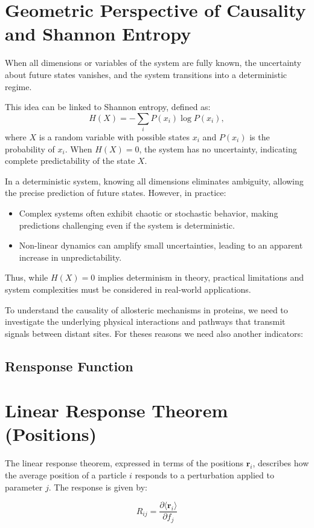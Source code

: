 \documentclass[English, Lau, oneside]{sapthesis}
\begin{document}
\begin{itemize}
\section*{Geometric Perspective of Causality and Shannon Entropy}
When all dimensions or variables of the system are fully known, the uncertainty about future states vanishes, and the system transitions into a deterministic regime.

This idea can be linked to Shannon entropy, defined as:
\[
H(X) = -\sum_{i} P(x_i) \log P(x_i),
\]
where \( X \) is a random variable with possible states \( x_i \) and \( P(x_i) \) is the probability of \( x_i \). When \( H(X) = 0 \), the system has no uncertainty, indicating complete predictability of the state \( X \).

In a deterministic system, knowing all dimensions eliminates ambiguity, allowing the precise prediction of future states. However, in practice:
\begin{itemize}
    \item Complex systems often exhibit chaotic or stochastic behavior, making predictions challenging even if the system is deterministic.
    \item Non-linear dynamics can amplify small uncertainties, leading to an apparent increase in unpredictability.
\end{itemize}

Thus, while \( H(X) = 0 \) implies determinism in theory, practical limitations and system complexities must be considered in real-world applications.

To understand the causality of allosteric mechanisms in proteins, we need to investigate the underlying physical interactions and pathways that transmit signals between distant sites.
For theses reasons we need also another indicators:
\subsection{Rensponse Function}
\section*{Linear Response Theorem (Positions)}

The linear response theorem, expressed in terms of the positions \(\mathbf{r}_i\), describes how the average position of a particle \(i\) responds to a perturbation applied to parameter \(j\). The response is given by:

\[
R_{ij} = \frac{\partial \langle \mathbf{r}_i \rangle}{\partial f_j}
\]


\end{itemize}
\end{document}
